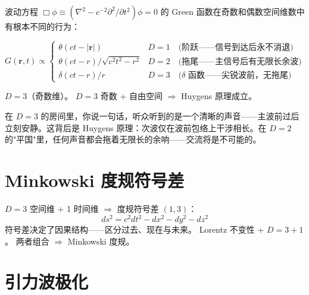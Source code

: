 波动方程 $\Box \phi \equiv (\nabla^2 - c^{-2}\partial^2/\partial t^2)\phi = 0$ 的 Green 函数在奇数和偶数空间维数中有根本不同的行为：

\begin{equation}
G(\mathbf{r},t) \propto
\begin{cases}
\theta(ct - |\mathbf{r}|)                  & D=1 \quad\text{(阶跃——信号到达后永不消退)}\\
\theta(ct - r)/\sqrt{c^2t^2 - r^2}       & D=2 \quad\text{(拖尾——主信号后有无限长余波)}\\
\delta(ct - r)/r                           & D=3 \quad\text{($\delta$ 函数——尖锐波前，无拖尾)}
\end{cases}
\end{equation}

\fbox{[N]} $D=3$（奇数维）。\fbox{[S]} $D=3$ 奇数 + 自由空间 $\Rightarrow$ Huygens 原理成立。


\begin{notebox}[生活经验与物理学]
  在 $D=3$ 的房间里，你说一句话，听众听到的是一个清晰的声音——主波前过后立刻安静。这背后是 Huygens 原理：次波仅在波前包络上干涉相长。在 $D=2$ 的"平国"里，任何声音都会拖着无限长的余响——交流将是不可能的。
\end{notebox}

\section{Minkowski 度规符号差}

$D=3$ 空间维 + 1 时间维 $\Rightarrow$ 度规符号差 $(1,3)$：
\begin{equation}
ds^2 = c^2 dt^2 - dx^2 - dy^2 - dz^2
\end{equation}
符号差决定了因果结构——区分过去、现在与未来。\fbox{[N]} Lorentz 不变性 + $D=3+1$。\fbox{[S]} 两者组合 $\Rightarrow$ Minkowski 度规。


\section{引力波极化}

